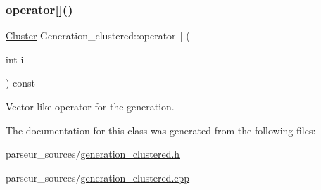 \mbox{\label{class_generation__clustered_a91d8016a9ce56103000902be5c1acd1c}} 
\subsubsection{\texorpdfstring{operator[]()}{operator[]()}\hspace{0.1cm}{\footnotesize\ttfamily [2/2]}}
{\footnotesize\ttfamily \hyperlink{class_cluster}{Cluster} Generation\+\_\+clustered\+::operator\mbox{[}$\,$\mbox{]} (\begin{DoxyParamCaption}\item[{int}]{i }\end{DoxyParamCaption}) const}



Vector-\/like operator for the generation. 



The documentation for this class was generated from the following files\+:\begin{DoxyCompactItemize}
\item 
parseur\+\_\+sources/\hyperlink{generation__clustered_8h}{generation\+\_\+clustered.\+h}\item 
parseur\+\_\+sources/\hyperlink{generation__clustered_8cpp}{generation\+\_\+clustered.\+cpp}\end{DoxyCompactItemize}
